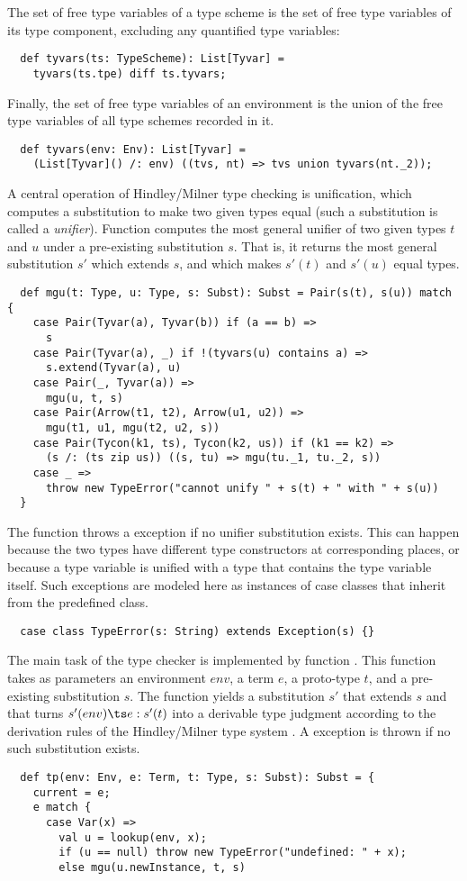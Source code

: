 {The set of free type variables of a type scheme is the set of free
type variables of its type component, excluding any quantified type variables:
\begin{lstlisting}
  def tyvars(ts: TypeScheme): List[Tyvar] = 
    tyvars(ts.tpe) diff ts.tyvars;
\end{lstlisting}
Finally, the set of free type variables of an environment is the union
of the free type variables of all type schemes recorded in it.
\begin{lstlisting}
  def tyvars(env: Env): List[Tyvar] =
    (List[Tyvar]() /: env) ((tvs, nt) => tvs union tyvars(nt._2));
\end{lstlisting}
A central operation of Hindley/Milner type checking is unification,
which computes a substitution to make two given types equal (such a
substitution is called a {\em unifier}).  Function  computes
the most general unifier of two given types $t$ and $u$ under a
pre-existing substitution $s$.  That is, it returns the most general
substitution $s'$ which extends $s$, and which makes $s'(t)$ and
$s'(u)$ equal types. 
\begin{lstlisting}
  def mgu(t: Type, u: Type, s: Subst): Subst = Pair(s(t), s(u)) match {
    case Pair(Tyvar(a), Tyvar(b)) if (a == b) => 
      s
    case Pair(Tyvar(a), _) if !(tyvars(u) contains a) =>
      s.extend(Tyvar(a), u)
    case Pair(_, Tyvar(a)) =>
      mgu(u, t, s)
    case Pair(Arrow(t1, t2), Arrow(u1, u2)) =>
      mgu(t1, u1, mgu(t2, u2, s))
    case Pair(Tycon(k1, ts), Tycon(k2, us)) if (k1 == k2) =>
      (s /: (ts zip us)) ((s, tu) => mgu(tu._1, tu._2, s))
    case _ => 
      throw new TypeError("cannot unify " + s(t) + " with " + s(u))
  }
\end{lstlisting}
The  function throws a  exception if no
unifier substitution exists. This can happen because the two types
have different type constructors at corresponding places, or because a
type variable is unified with a type that contains the type variable
itself. Such exceptions are modeled here as instances of case classes
that inherit from the predefined  class.
\begin{lstlisting}
  case class TypeError(s: String) extends Exception(s) {}
\end{lstlisting}
The main task of the type checker is implemented by function
. This function takes as parameters an environment $env$, a
term $e$, a proto-type $t$, and a
pre-existing substitution $s$.  The function yields a substitution
$s'$ that extends $s$ and that
turns $s'(env) \ts e: s'(t)$ into a derivable type judgment according
to the derivation rules of the Hindley/Milner type system \cite{milner:polymorphism}.  A
 exception is thrown if no such substitution exists.
\begin{lstlisting}
  def tp(env: Env, e: Term, t: Type, s: Subst): Subst = {
    current = e;
    e match {
      case Var(x) =>
        val u = lookup(env, x);
        if (u == null) throw new TypeError("undefined: " + x);
        else mgu(u.newInstance, t, s)


\end{lstlisting}}
